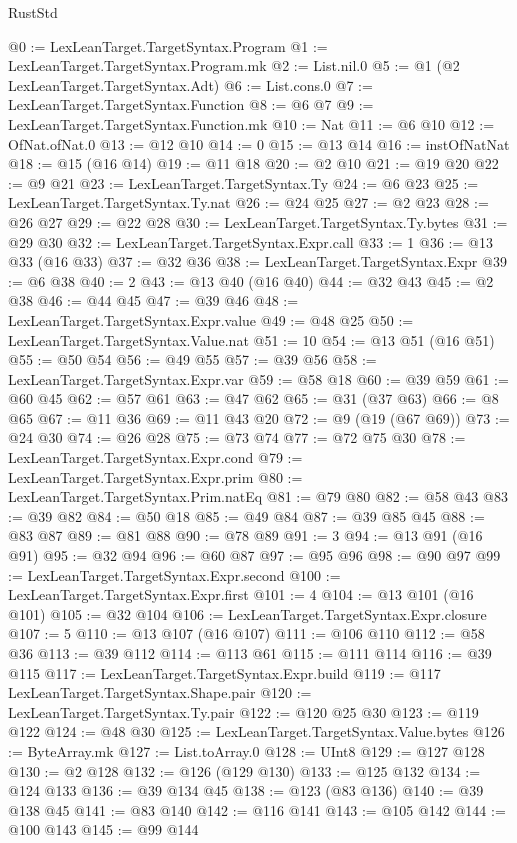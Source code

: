 \begin{lexlean}{RustStd}
\begin{coremodule}
@0 := LexLeanTarget.TargetSyntax.Program
@1 := LexLeanTarget.TargetSyntax.Program.mk
@2 := List.nil.{0}
@5 := @1 (@2 LexLeanTarget.TargetSyntax.Adt)
@6 := List.cons.{0}
@7 := LexLeanTarget.TargetSyntax.Function
@8 := @6 @7
@9 := LexLeanTarget.TargetSyntax.Function.mk
@10 := Nat
@11 := @6 @10
@12 := OfNat.ofNat.{0}
@13 := @12 @10
@14 := 0
@15 := @13 @14
@16 := instOfNatNat
@18 := @15 (@16 @14)
@19 := @11 @18
@20 := @2 @10
@21 := @19 @20
@22 := @9 @21
@23 := LexLeanTarget.TargetSyntax.Ty
@24 := @6 @23
@25 := LexLeanTarget.TargetSyntax.Ty.nat
@26 := @24 @25
@27 := @2 @23
@28 := @26 @27
@29 := @22 @28
@30 := LexLeanTarget.TargetSyntax.Ty.bytes
@31 := @29 @30
@32 := LexLeanTarget.TargetSyntax.Expr.call
@33 := 1
@36 := @13 @33 (@16 @33)
@37 := @32 @36
@38 := LexLeanTarget.TargetSyntax.Expr
@39 := @6 @38
@40 := 2
@43 := @13 @40 (@16 @40)
@44 := @32 @43
@45 := @2 @38
@46 := @44 @45
@47 := @39 @46
@48 := LexLeanTarget.TargetSyntax.Expr.value
@49 := @48 @25
@50 := LexLeanTarget.TargetSyntax.Value.nat
@51 := 10
@54 := @13 @51 (@16 @51)
@55 := @50 @54
@56 := @49 @55
@57 := @39 @56
@58 := LexLeanTarget.TargetSyntax.Expr.var
@59 := @58 @18
@60 := @39 @59
@61 := @60 @45
@62 := @57 @61
@63 := @47 @62
@65 := @31 (@37 @63)
@66 := @8 @65
@67 := @11 @36
@69 := @11 @43 @20
@72 := @9 (@19 (@67 @69))
@73 := @24 @30
@74 := @26 @28
@75 := @73 @74
@77 := @72 @75 @30
@78 := LexLeanTarget.TargetSyntax.Expr.cond
@79 := LexLeanTarget.TargetSyntax.Expr.prim
@80 := LexLeanTarget.TargetSyntax.Prim.natEq
@81 := @79 @80
@82 := @58 @43
@83 := @39 @82
@84 := @50 @18
@85 := @49 @84
@87 := @39 @85 @45
@88 := @83 @87
@89 := @81 @88
@90 := @78 @89
@91 := 3
@94 := @13 @91 (@16 @91)
@95 := @32 @94
@96 := @60 @87
@97 := @95 @96
@98 := @90 @97
@99 := LexLeanTarget.TargetSyntax.Expr.second
@100 := LexLeanTarget.TargetSyntax.Expr.first
@101 := 4
@104 := @13 @101 (@16 @101)
@105 := @32 @104
@106 := LexLeanTarget.TargetSyntax.Expr.closure
@107 := 5
@110 := @13 @107 (@16 @107)
@111 := @106 @110
@112 := @58 @36
@113 := @39 @112
@114 := @113 @61
@115 := @111 @114
@116 := @39 @115
@117 := LexLeanTarget.TargetSyntax.Expr.build
@119 := @117 LexLeanTarget.TargetSyntax.Shape.pair
@120 := LexLeanTarget.TargetSyntax.Ty.pair
@122 := @120 @25 @30
@123 := @119 @122
@124 := @48 @30
@125 := LexLeanTarget.TargetSyntax.Value.bytes
@126 := ByteArray.mk
@127 := List.toArray.{0}
@128 := UInt8
@129 := @127 @128
@130 := @2 @128
@132 := @126 (@129 @130)
@133 := @125 @132
@134 := @124 @133
@136 := @39 @134 @45
@138 := @123 (@83 @136)
@140 := @39 @138 @45
@141 := @83 @140
@142 := @116 @141
@143 := @105 @142
@144 := @100 @143
@145 := @99 @144

\end{coremodule}
\end{lexlean}
